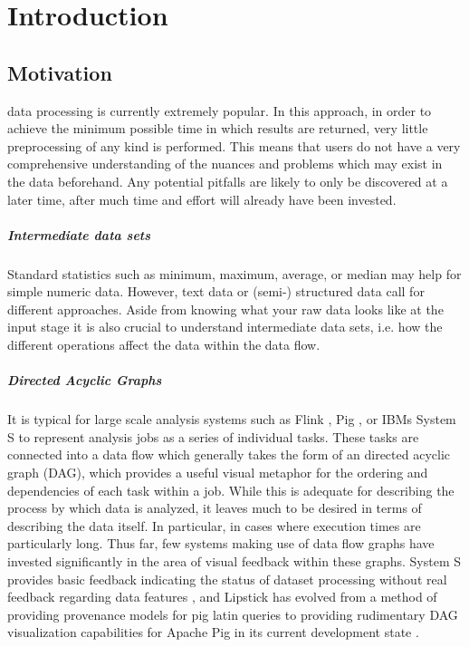 \chapter{Introduction}
\label{sec:Introduction}



\section{Motivation}
 data processing is currently extremely popular. In this approach, in order to achieve the minimum possible time in which results are returned, very little preprocessing of any kind is performed. This means that users do not have a very comprehensive understanding of the nuances and problems which may exist in the data beforehand. Any potential pitfalls are likely to only be discovered at a later time, after much time and effort will already have been invested.

\paragraph{Intermediate data sets}
Standard statistics such as minimum, maximum, average, or median may help for simple numeric data. However, text data or (semi-) structured data call for different approaches. Aside from knowing what your raw data looks like at the input stage it is also crucial to understand intermediate data sets, i.e. how the different operations affect the data within the data flow.

\paragraph{Directed Acyclic Graphs}
It is typical for large scale analysis systems such as Flink \cite{Battre2010}, Pig \cite{Amsterdamer2011}, or IBMs System S \cite{Gedik2008} to represent analysis jobs as a series of individual tasks. These tasks are connected into a data flow which generally takes the form of an directed acyclic graph (DAG), which provides a useful visual metaphor for the ordering and dependencies of each task within a job. While this is adequate for describing the process by which data is analyzed, it leaves much to be desired in terms of describing the data itself. In particular, in cases where execution times are particularly long. Thus far, few systems making use of data flow graphs have invested significantly in the area of visual feedback within these graphs. System S provides basic feedback indicating the status of dataset processing without real feedback regarding data features \cite{Pauw2010}, and Lipstick has evolved from a method of providing provenance models for pig latin queries \cite{Amsterdamer2011} to providing rudimentary DAG visualization capabilities for Apache Pig in its current development state \cite{Amsterdamer2011}.

